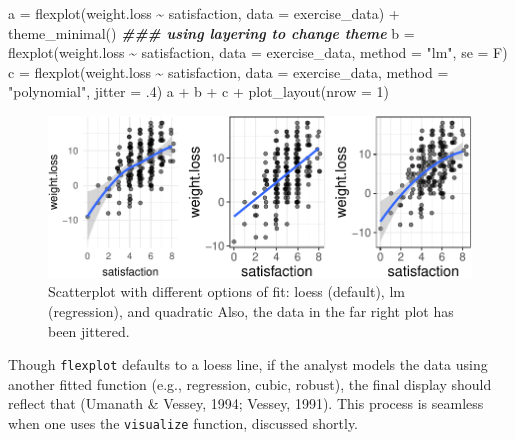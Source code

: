 \documentclass[
  english,
  man]{apa6}
\newenvironment{Shaded}{\begin{snugshade}}{\end{snugshade}}
\newcommand{\AttributeTok}[1]{\textcolor[rgb]{0.77,0.63,0.00}{#1}}
\newcommand{\DecValTok}[1]{\textcolor[rgb]{0.00,0.00,0.81}{#1}}
\newcommand{\DocumentationTok}[1]{\textcolor[rgb]{0.56,0.35,0.01}{\textbf{\textit{#1}}}}
\newcommand{\FunctionTok}[1]{\textcolor[rgb]{0.00,0.00,0.00}{#1}}
\newcommand{\NormalTok}[1]{#1}
\newcommand{\OtherTok}[1]{\textcolor[rgb]{0.56,0.35,0.01}{#1}}
\newcommand{\SpecialCharTok}[1]{\textcolor[rgb]{0.00,0.00,0.00}{#1}}
\newcommand{\StringTok}[1]{\textcolor[rgb]{0.31,0.60,0.02}{#1}}
\begin{document}
\begin{Shaded}
\begin{Highlighting}[]
\NormalTok{a }\OtherTok{=} \FunctionTok{flexplot}\NormalTok{(weight.loss }\SpecialCharTok{\textasciitilde{}}\NormalTok{ satisfaction, }\AttributeTok{data =}\NormalTok{ exercise\_data) }\SpecialCharTok{+} 
  \FunctionTok{theme\_minimal}\NormalTok{() }\DocumentationTok{\#\#\# using layering to change theme}
\NormalTok{b }\OtherTok{=} \FunctionTok{flexplot}\NormalTok{(weight.loss }\SpecialCharTok{\textasciitilde{}}\NormalTok{ satisfaction, }\AttributeTok{data =}\NormalTok{ exercise\_data, }
             \AttributeTok{method =} \StringTok{"lm"}\NormalTok{, }\AttributeTok{se =}\NormalTok{ F)}
\NormalTok{c }\OtherTok{=} \FunctionTok{flexplot}\NormalTok{(weight.loss }\SpecialCharTok{\textasciitilde{}}\NormalTok{ satisfaction, }\AttributeTok{data =}\NormalTok{ exercise\_data, }
             \AttributeTok{method =} \StringTok{"polynomial"}\NormalTok{, }\AttributeTok{jitter =}\NormalTok{ .}\DecValTok{4}\NormalTok{)}
\NormalTok{a }\SpecialCharTok{+}\NormalTok{ b }\SpecialCharTok{+}\NormalTok{ c }\SpecialCharTok{+} \FunctionTok{plot\_layout}\NormalTok{(}\AttributeTok{nrow =} \DecValTok{1}\NormalTok{)}
\end{Highlighting}
\end{Shaded}

\begin{figure}

{\centering \includegraphics{flexplot_psychmeth_files/figure-latex/scatter-1} 

}

\caption{Scatterplot with different options of fit: loess (default), lm (regression), and quadratic Also, the data in the far right plot has been jittered. }\label{fig:scatter}
\end{figure}

\normalsize

Though \texttt{flexplot} defaults to a loess line, if the analyst models the data using another fitted function (e.g., regression, cubic, robust), the final display should reflect that (Umanath \& Vessey, 1994; Vessey, 1991). This process is seamless when one uses the \texttt{visualize} function, discussed shortly.
\end{document}
